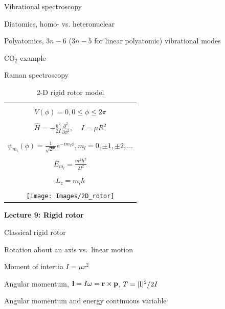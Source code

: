 \message{ !name(Outline.tex)}\documentclass[11pt]{article}
\begin{document}
\begin{outline}
\begin{outline}
    \item Vibrational spectroscopy
      \begin{outline}
        \item Diatomics, homo- vs. heteronuclear
        \item Polyatomics, $3n-6$ ($3n-5$ for linear polyatomic) vibrational modes
        \item CO$_2$ example
      \end{outline}

    \item Raman spectroscopy
 \end{outline}

\begin{table}[tbh]
   \begin{center}
   \caption{2-D rigid rotor model}
    \label{Rigid rotor}
\begin{tabular}[h]{|c|}
\hline
 \\
$\displaystyle       V(\phi) = 0, 0 \leq \phi \leq 2\pi $ \\
 \\
$\displaystyle \hat H = -\frac{\hbar^2}{2 I} \frac{\partial^2}{\partial
  \phi^2},\ \ \ \ \ I=\mu R^2
$\\
\\
$\displaystyle     \psi_{m_l}(\phi) = \frac{1}{\sqrt{2\pi}} e^{-i m_l \phi}, m_l
= 0, \pm 1, \pm 2, \ldots $ \\
\\
$\displaystyle     E_{m_l}=\frac{m_l^2 \hbar^2}{2 I^2}$ \\
 \\
$\displaystyle L_z = m_l \hbar$ \\
\\
     \texttt{[image: Images/2D\_rotor]} \\       
\hline
\end{tabular}
 \end{center}
\end{table}

\item{{\bf Lecture 9: Rigid rotor}}
  \begin{outline}
  \item Classical rigid rotor
    \begin{outline}
      \item Rotation about an axis vs.\ linear motion
      \item Moment of intertia $I=\mu r^2$
      \item Angular momentum, ${\bf l} = I {\bf \omega}= {\bf r}\times{\bf p}$, $T=|{\bf l}|^2/2 I$
      \item Angular momentum and energy continuous variable
    \end{outline}


\end{outline}
\end{outline}
\end{document}
